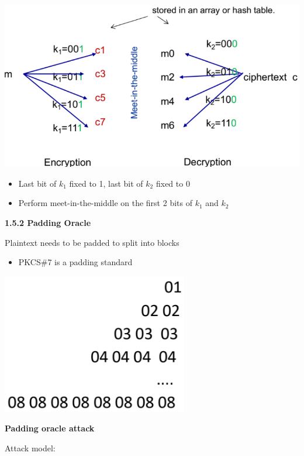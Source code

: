 \documentclass[landscape,a4paper]{extarticle}
\newenvironment{Figure}
  {\par\noindent\minipage{\linewidth}}
  {\endminipage\par\medskip}
\begin{document}
\begin{multicols*}{5}
    \begin{Figure}
        \centering
        \includegraphics[width=\linewidth]{meet_in_the_middle_tradeoff.png}        
    \end{Figure}

    \begin{itemize}
        \item Last bit of $k_1$ fixed to 1, last bit of $k_2$ fixed to 0
        \item Perform meet-in-the-middle on the first 2 bits of $k_1$ and $k_2$
    \end{itemize}

    \textbf{1.5.2 Padding Oracle}

    Plaintext needs to be padded to split into blocks

    \begin{itemize}
        \item PKCS\#7 is a padding standard
    \end{itemize}

    \begin{Figure}
        \includegraphics[width=0.5\linewidth]{pkcs7.png}        
    \end{Figure}

    \textbf{Padding oracle attack}

    Attack model: 


\end{multicols*}
\end{document}
